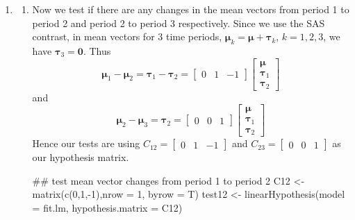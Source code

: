 \documentclass{article}
\begin{document}
\begin{enumerate}[leftmargin = 0 em, label = \arabic*., font = \bfseries]
\begin{rcode*}{fontsize = \footnotesize}
Multivariate Tests: period
                 Df test stat approx F num Df den Df    Pr(>F)   
Pillai            2 0.1722118 2.002148      8    170 0.0489045 * 
Wilks             2 0.8301027 2.049069      8    168 0.0435825 * 
Hotelling-Lawley  2 0.2018820 2.094526      8    166 0.0389623 * 
Roy               2 0.1869691 3.973094      4     85 0.0052784 **
---
Signif. codes:  0 ‘***’ 0.001 ‘**’ 0.01 ‘*’ 0.05 ‘.’ 0.1 ‘ ’ 1
\end{rcode*}

With small p-value, we conclude that the mean vectors of 4 measurements are different for the 3 time periods. The assumptions are also multivariate normality and homogeneous variance covariance matrix for the 3 periods, which can be justified by answers in part 1 and part 2.


\item 
\begin{enumerate}
	\item Now we test if there are any changes in the mean vectors from period 1 to period 2 and period 2 to period 3 respectively. Since we use the SAS contrast, in mean vectors for 3 time periods, $\bm \mu_{k} = \bm \mu + \bm \tau_k,\, k = 1, 2, 3$, we have $\bm \tau_3 = \bm 0$. Thus
	\[
		\bm \mu_1 - \bm \mu_2 = \bm \tau_{1} - \bm \tau_{2} = \begin{bmatrix}
		 0 & 1 & -1
	\end{bmatrix} \begin{bmatrix}
		\bm \mu\\
		\bm \tau_{1}\\
		\bm \tau_{2}
	\end{bmatrix}\]
	and
	\[
		\bm \mu_{2} - \bm \mu_3 = \bm \tau_{2} = \begin{bmatrix}
		 0 & 0 & 1
	\end{bmatrix} \begin{bmatrix}
		\bm \mu\\
		\bm \tau_{1}\\
		\bm \tau_{2}
	\end{bmatrix}\]
	Hence our tests are using $C_{12} = \begin{bmatrix}
		0 & 1 & -1
	\end{bmatrix}$ and $C_{23} = \begin{bmatrix}
		0 & 0 & 1
	\end{bmatrix}$ as our hypothesis matrix.

	\begin{rcode}
## test mean vector changes from period 1 to period 2
C12 <- matrix(c(0,1,-1),nrow = 1, byrow = T)
test12 <- linearHypothesis(model = fit.lm, hypothesis.matrix = C12)


\end{rcode}
\end{enumerate}
\end{enumerate}
\end{document}

